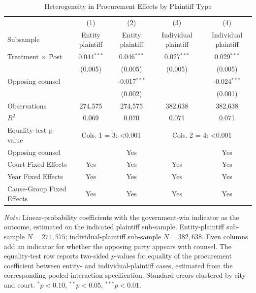 \begin{table}[!htbp]
\setlength{\abovecaptionskip}{0pt}
\centering
\caption{Heterogeneity in Procurement Effects by Plaintiff Type}
\label{tab:admin_plaintiff_heterogeneity}
\begin{threeparttable}
\begin{tabular}{lcccc}
\toprule
 & (1) & (2) & (3) & (4) \\
Subsample & Entity plaintiff & Entity plaintiff & Individual plaintiff & Individual plaintiff \\
\midrule
Treatment $\times$ Post & 0.044$^{***}$ & 0.046$^{***}$ & 0.027$^{***}$ & 0.029$^{***}$ \\
& (0.005) & (0.005) & (0.005) & (0.005) \\
\addlinespace
Opposing counsel &  & -0.017$^{***}$ &  & -0.024$^{***}$ \\
&  & (0.002) &  & (0.001) \\
\addlinespace
Observations & 274,575 & 274,575 & 382,638 & 382,638 \\
$R^2$ & 0.069 & 0.070 & 0.071 & 0.071 \\
Equality-test p-value & \multicolumn{2}{c}{Cols. 1 = 3: <0.001} & \multicolumn{2}{c}{Cols. 2 = 4: <0.001} \\
Opposing counsel &  & Yes &  & Yes \\
Court Fixed Effects & Yes & Yes & Yes & Yes \\
Year Fixed Effects & Yes & Yes & Yes & Yes \\
Cause-Group Fixed Effects & Yes & Yes & Yes & Yes \\
\bottomrule
\end{tabular}
\begin{tablenotes}[flushleft]
\footnotesize
\item \textit{Note:} Linear-probability coefficients with the government-win indicator as the outcome, estimated on the indicated plaintiff sub-sample. Entity-plaintiff sub-sample $N=274,575$; individual-plaintiff sub-sample $N=382,638$. Even columns add an indicator for whether the opposing party appears with counsel. The equality-test row reports two-sided $p$-values for equality of the procurement coefficient between entity- and individual-plaintiff cases, estimated from the corresponding pooled interaction specification. Standard errors clustered by city and court. $^{*}p<0.10$, $^{**}p<0.05$, $^{***}p<0.01$.
\end{tablenotes}
\end{threeparttable}
\end{table}
